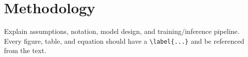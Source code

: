 ﻿\section{Methodology}

Explain assumptions, notation, model design, and training/inference pipeline.
Every figure, table, and equation should have a \texttt{\textbackslash label\{...\}}
and be referenced from the text.

